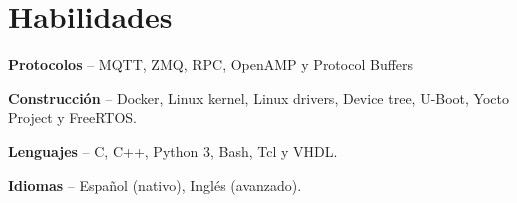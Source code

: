 \section{Habilidades}
\begin{small}
	\parbox[t][][t]{\linewidth}{
		\textbf{Protocolos} -- {MQTT, ZMQ, RPC, OpenAMP y Protocol Buffers}
		\bigbreak
	}
	\parbox[t][][t]{\linewidth}{
		\textbf{Construcción} -- {Docker, Linux kernel, Linux drivers, Device tree, U-Boot, Yocto Project y FreeRTOS.}
		\bigbreak
	}
	\parbox[t][][t]{\linewidth}{
		\textbf{Lenguajes} -- {C, C++, Python 3, Bash, Tcl y VHDL.}
		\bigbreak
	}
	\parbox[t][][t]{\linewidth}{
		\textbf{Idiomas} -- {Español (nativo), Inglés (avanzado).}
		\bigbreak
	}
\end{small}
